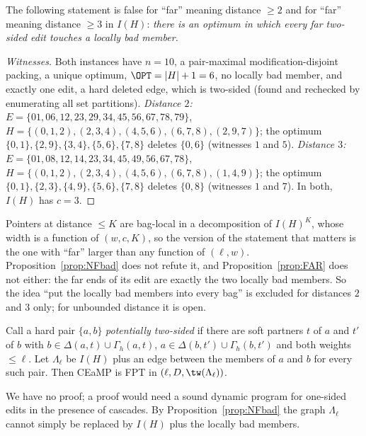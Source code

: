 \begin{proposition}\label{prop:NFbad}
The following statement is false for ``far'' meaning distance $\ge2$ and for ``far'' meaning distance $\ge3$ in $I(H)$: \emph{there is an optimum in which every far two-sided edit touches a locally bad member.}
\end{proposition}
\begin{proof}[Witnesses]
Both instances have $n=10$, a pair-maximal modification-disjoint packing, a unique optimum, $\OPT=|H|+1=6$, no locally bad member, and exactly one edit, a hard deleted edge, which is two-sided (found and rechecked by enumerating all set partitions).
\emph{Distance $2$:} $E=\{01,06,12,23,29,34,45,56,67,78,79\}$, $H=\{(0,1,2),(2,3,4),(4,5,6),(6,7,8),(2,9,7)\}$; the optimum $\{0,1\},\{2,9\},\{3,4\},\{5,6\},\{7,8\}$ deletes $\{0,6\}$ (witnesses $1$ and $5$).
\emph{Distance $3$:} $E=\{01,08,12,14,23,34,45,49,56,67,78\}$, $H=\{(0,1,2),(2,3,4),(4,5,6),(6,7,8),(1,4,9)\}$; the optimum $\{0,1\},\{2,3\},\{4,9\},\{5,6\},\{7,8\}$ deletes $\{0,8\}$ (witnesses $1$ and $7$). In both, $I(H)$ has $c=3$.
\end{proof}
\begin{remark}[Scope]\label{rem:NFscope}
Pointers at distance $\le K$ are bag-local in a decomposition of $I(H)^K$, whose width is a function of $(w,c,K)$, so the version of the statement that matters is the one with ``far'' larger than any function of $(\ell,w)$. Proposition~\ref{prop:NFbad} does not refute it, and Proposition~\ref{prop:FAR} does not either: the far ends of its edit are exactly the two locally bad members. So the idea ``put the locally bad members into every bag'' is excluded for distances $2$ and $3$ only; for unbounded distance it is open.
\end{remark}

\begin{conjecture}\label{conj:Lambda}
Call a hard pair $\{a,b\}$ \emph{potentially two-sided} if there are soft partners $t$ of $a$ and $t'$ of $b$ with $b\in\Delta(a,t)\cup\Gamma_h(a,t)$, $a\in\Delta(b,t')\cup\Gamma_h(b,t')$ and both weights $\le\ell$. Let $\Lambda_\ell$ be $I(H)$ plus an edge between the members of $a$ and $b$ for every such pair. Then CEaMP is FPT in $(\ell,D,\tw(\Lambda_\ell))$.
\end{conjecture}
We have no proof; a proof would need a sound dynamic program for one-sided edits in the presence of cascades. By Proposition~\ref{prop:NFbad} the graph $\Lambda_\ell$ cannot simply be replaced by $I(H)$ plus the locally bad members.

